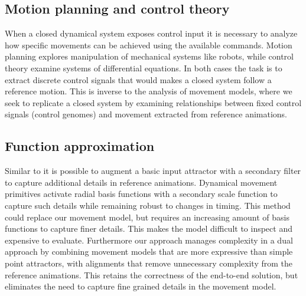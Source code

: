 \subsection{Motion planning and control theory}
When a closed dynamical system exposes control input it is necessary to analyze how specific movements can be achieved using the available commands. Motion planning explores manipulation of mechanical systems like robots, while control theory examine systems of differential equations. In both cases the task is to extract discrete control signals that would makes a closed system follow a reference motion. This is inverse to the analysis of movement models, where we seek to replicate a closed system by examining relationships between fixed control signals (control genomes) and movement extracted from reference animations. 

\subsection{Function approximation}
Similar to \citep{startke20} it is possible to augment a basic input attractor with a secondary filter to capture additional details in reference animations. Dynamical movement primitives activate radial basis functions with a secondary scale function to capture such details while remaining robust to changes in timing. This method could replace our movement model, but requires an increasing amount of basis functions to capture finer details. This makes the model difficult to inspect and expensive to evaluate. Furthermore our approach manages complexity in a dual approach by combining movement models that are more expressive than simple point attractors, with alignments that remove unnecessary complexity from the reference animations. This retains the correctness of the end-to-end solution, but eliminates the need to capture fine grained details in the movement model.





